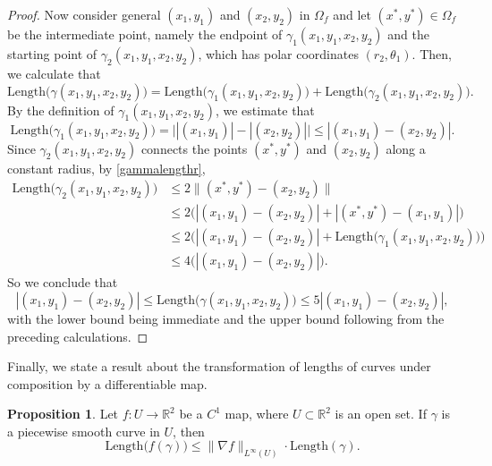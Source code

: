 \documentclass[11pt]{article}
\def\R{{\mathbb R}}
\theoremstyle{definition}
\newtheorem{proposition}{Proposition}[section]
\begin{document}
\begin{proof}
Now consider general $(x_{1}, y_{1})$ and $(x_{2}, y_{2})$ in $\Omega_{f}$ and let $(x^{*}, y^{*}) \in \Omega_{f}$ be the intermediate point, namely the endpoint of $\gamma_{1}(x_{1}, y_{1}, x_{2}, y_{2})$ and the starting point of $\gamma_{2}(x_{1}, y_{1}, x_{2}, y_{2})$, which has polar coordinates $(r_{2}, \theta_{1})$. Then, we calculate that
\begin{equation*}
\text{Length}\Big(\gamma(x_{1}, y_{1}, x_{2}, y_{2})\Big) = \text{Length}\Big(\gamma_{1}(x_{1}, y_{1}, x_{2}, y_{2})\Big) + \text{Length}\Big(\gamma_{2}(x_{1}, y_{1}, x_{2}, y_{2})\Big).
\end{equation*}
By the definition of $\gamma_{1}(x_{1}, y_{1}, x_{2}, y_{2})$, we estimate that
\begin{equation*}
\text{Length}\Big(\gamma_{1}(x_{1}, y_{1}, x_{2}, y_{2})\Big) = \Big||(x_{1}, y_{1})| - |(x_{2}, y_{2})|\Big| \le |(x_{1}, y_{1}) - (x_{2}, y_{2})|. 
\end{equation*}
Since $\gamma_{2}(x_{1}, y_{1}, x_{2}, y_{2})$ connects the points $(x^{*}, y^{*})$ and $(x_{2}, y_{2})$ along a constant radius, by \eqref{gammalengthr},
\begin{align*}
\text{Length}\Big(\gamma_{2}(x_{1}, y_{1}, x_{2}, y_{2})\Big) &\le 2\|(x^{*}, y^{*}) - (x_{2}, y_{2})\| \\
&\le 2\Big(|(x_{1}, y_{1}) - (x_{2}, y_{2})| + |(x^{*}, y^{*}) - (x_{1}, y_{1})|\Big) \\
&\le 2\Big(|(x_{1}, y_{1}) - (x_{2}, y_{2})| + \text{Length}\Big(\gamma_{1}(x_{1}, y_{1}, x_{2}, y_{2})\Big)\Big) \\
&\le 4\Big(|(x_{1}, y_{1}) - (x_{2}, y_{2})|\Big).
\end{align*}
So we conclude that
\begin{equation*}
|(x_{1}, y_{1}) - (x_{2}, y_{2})| \le \text{Length}\Big(\gamma(x_{1}, y_{1}, x_{2}, y_{2})\Big) \le 5|(x_{1}, y_{1}) - (x_{2}, y_{2})|,
\end{equation*}
with the lower bound being immediate and the upper bound following from the preceding calculations.
\end{proof}

Finally, we state a result about the transformation of lengths of curves under composition by a differentiable map.

\begin{proposition}\label{lengthtransform}
Let $f: U \to \R^{2}$ be a $C^{1}$ map, where $U \subset \R^{2}$ is an open set. If $\gamma$ is a piecewise smooth curve in $U$, then 
\begin{equation*}
\text{Length}\Big(f(\gamma)\Big) \le \|\nabla f\|_{L^{\infty}(U)} \cdot \text{Length}(\gamma).
\end{equation*}
\end{proposition}
\end{document}
